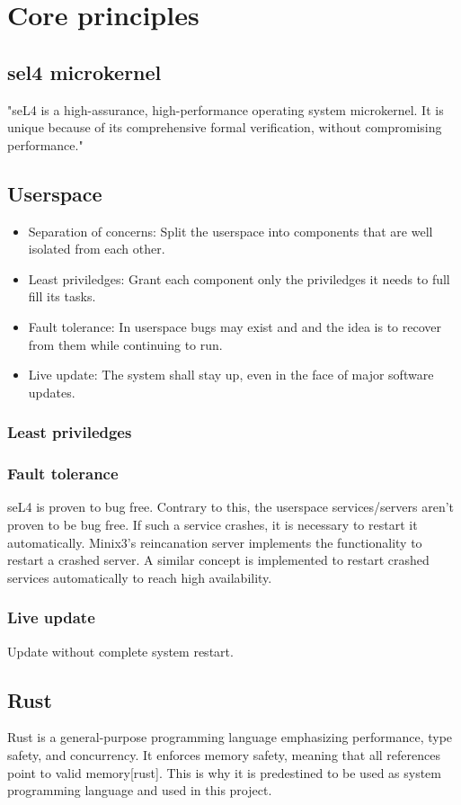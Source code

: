 \section{Core principles}


\subsection{sel4 microkernel}
"seL4 is a high-assurance, high-performance operating system microkernel. It is unique because of its comprehensive formal verification, without compromising performance." \cite{seL4:2024}

\subsection{Userspace}

\begin{itemize}
    \item Separation of concerns: Split the userspace into components that are well isolated from each other.
    \item Least priviledges: Grant each component only the priviledges it needs to full fill its tasks.    
    \item Fault tolerance: In userspace bugs may exist and and the idea is to recover from them while continuing to run.
    \item Live update: The system shall stay up, even in the face of major software updates.
\end{itemize}

\subsubsection{Least priviledges}

\subsubsection{Fault tolerance}
seL4 is proven to bug free. Contrary to this, the userspace services/servers aren't proven to be bug free. If such a service crashes, it is necessary to restart it automatically.
Minix3's reincanation server \cite{minix3:2010} implements the functionality to restart a crashed server. A similar concept is implemented to restart crashed services automatically to reach 
high availability.

\subsubsection{Live update}
Update without complete system restart.

\subsection{Rust}
Rust is a general-purpose programming language emphasizing performance, type safety, and concurrency. It enforces memory safety, meaning that all references point to valid memory[rust]. 
This is why it is predestined to be used as system programming language and used in this project.
